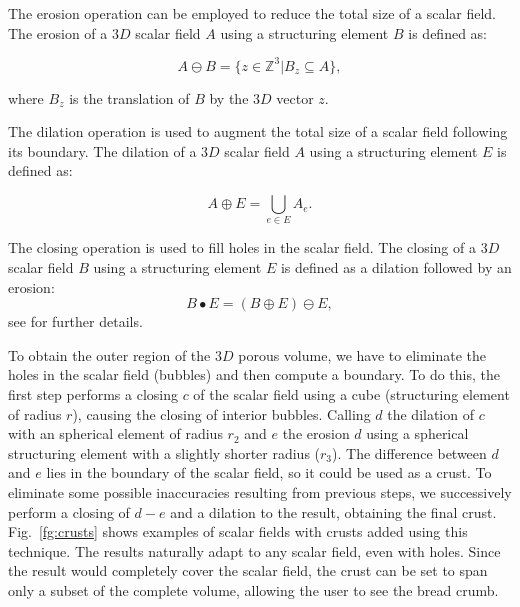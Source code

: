 The erosion operation can be employed to reduce the total size of a scalar field.
The erosion of a $3D$ scalar field $A$ using a structuring element $B$ is defined as:

\begin{equation}
A \ominus B = \{z\in \mathbb{Z}^3 | B_{z} \subseteq A\},
\end{equation}

\noindent where $B_{z}$ is the translation of $B$ by the $3D$ vector $z$.

The dilation operation is used to augment the total size of a scalar field following its boundary.
The dilation of a $3D$ scalar field $A$ using a structuring element $E$ is defined as:

\begin{equation}
A  \oplus E = \bigcup_{e\in E} A_e.
\end{equation}

The closing operation is used to fill holes in the scalar field.
The closing of a $3D$ scalar field $B$ using a structuring element $E$ is defined as a dilation followed by an erosion:
\begin{equation}
B \bullet E = (B \oplus E) \ominus E,
\end{equation}
see \cite{Gonzalez2001} for further details.

To obtain the outer region of the $3D$ porous volume, we have to eliminate the holes in the scalar field (bubbles) and then compute a boundary.
To do this, the first step performs a closing $c$ of the scalar field using a cube (structuring element of radius $r$), causing the closing of interior bubbles.
Calling $d$ the dilation of $c$ with an spherical element of radius $r_{2}$ and $e$ the erosion $d$ using a spherical structuring element with a slightly shorter radius ($r_{3}$).
The difference between $d$ and $e$ lies in the boundary of the scalar field, so it could be used as a crust.
To eliminate some possible inaccuracies resulting from previous steps, we successively perform a closing of $d-e$ and a dilation to the result, obtaining the final crust.
Fig.~\ref{fg:crusts} shows examples of scalar fields with crusts added using this technique. The results naturally adapt to any scalar field, even with holes.
Since the result would completely cover the scalar field, the crust can be set to span only a subset of the complete volume, allowing the user to see the bread crumb.


